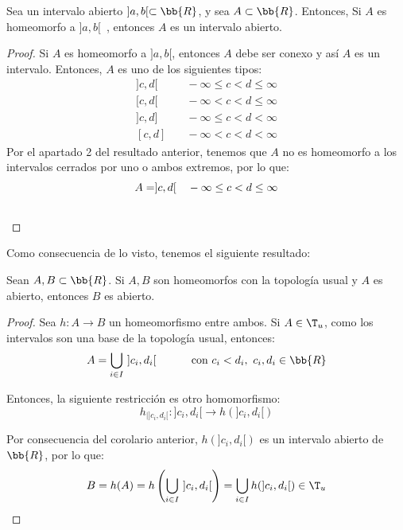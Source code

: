 \begin{coro}
    Sea un intervalo abierto $]a,b[\subset \bb{R}$, y sea $A\subset \bb{R}$. Entonces, Si $A$ es homeomorfo a $]a,b[$~, entonces $A$ es un intervalo abierto.
\end{coro}
\begin{proof}
    Si $A$ es homeomorfo a $]a,b[$, entonces $A$ debe ser conexo y así $A$ es un intervalo. Entonces, $A$ es uno de los siguientes tipos:
    \begin{align*}
        ]c,d[ &\quad -\infty \leq c<d\leq \infty\\
        [c,d[ &\quad -\infty < c<d\leq \infty \\
        ]c,d] &\quad -\infty \leq c<d< \infty \\
        [c,d] &\quad -\infty < c<d< \infty
    \end{align*}
    Por el apartado 2 del resultado anterior, tenemos que $A$ no es homeomorfo a los intervalos cerrados por uno o ambos extremos,
    por lo que:
    \begin{align*}
        A=]c,d[ &\quad -\infty \leq c<d\leq \infty \\& \hfill \qedhere
    \end{align*}
\end{proof}


Como consecuencia de lo visto, tenemos el siguiente resultado:
\begin{teo}
    Sean $A,B\subset \bb{R}$. Si $A,B$ son homeomorfos con la topología usual y $A$ es abierto, entonces $B$ es abierto.
\end{teo}
\begin{proof}
    Sea $h:A\to B$ un homeomorfismo entre ambos. Si $A\in \T_u$, como los intervalos son una base de la topología usual, entonces:
    \begin{equation*}
        A=\bigcup_{i\in I}~]c_i, d_i[ \text{\hspace{1cm} con } c_i<d_i,~ c_i,d_i\in \bb{R}
    \end{equation*}

    Entonces, la siguiente restricción es otro homomorfismo:
    \begin{equation*}
        h_{\big | ]c_i,d_i[}:]c_i,d_i[\to h(]c_i,d_i[)
    \end{equation*}

    Por consecuencia del corolario anterior, $h(]c_i,d_i[)$ es un intervalo abierto de $\bb{R}$, por lo que:
    \begin{equation*}
        B=h(A)=h\left(\bigcup_{i\in I}~]c_i, d_i[\right)=\bigcup_{i\in I} h(]c_i,d_i[)\in \T_u
    \end{equation*}
\end{proof}


